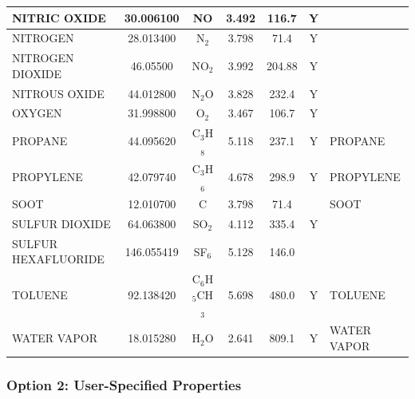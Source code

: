 \documentclass[11pt]{book}
\begin{document}
\begin{table}[p]
\begin{center}
\begin{tabular}{|l|c|c|c|c|c|l|}
{\ct NITRIC OXIDE}       & 30.006100  & NO               & 3.492    & 116.7    &  Y       &                                 \\ \hline
{\ct NITROGEN}           & 28.013400  & N$_2$            & 3.798    & 71.4     &  Y       &                                 \\ \hline
{\ct NITROGEN DIOXIDE}   & 46.05500   & NO$_2$           & 3.992    & 204.88   &  Y       &                                 \\ \hline
{\ct NITROUS OXIDE}      & 44.012800  & N$_2$O           & 3.828    & 232.4    &  Y       &                                 \\ \hline
{\ct OXYGEN}             & 31.998800  & O$_2$            & 3.467    & 106.7    &  Y       &                                 \\ \hline
{\ct PROPANE}            & 44.095620  & C$_3$H$_8$       & 5.118    & 237.1    &  Y       &  {\ct PROPANE}                  \\ \hline
{\ct PROPYLENE}          & 42.079740  & C$_3$H$_6$       & 4.678    & 298.9    &  Y       &  {\ct PROPYLENE}                \\ \hline
{\ct SOOT}               & 12.010700  & C                & 3.798    & 71.4     &          &  {\ct SOOT}                     \\ \hline
{\ct SULFUR DIOXIDE}     & 64.063800  & SO$_2$           & 4.112    & 335.4    &  Y       &                                 \\ \hline
{\ct SULFUR HEXAFLUORIDE}& 146.055419 & SF$_6$           & 5.128    & 146.0    &          &                                 \\ \hline
{\ct TOLUENE}            & 92.138420  & C$_6$H$_5$CH$_3$ & 5.698    & 480.0    &  Y       &  {\ct TOLUENE}                  \\ \hline
{\ct WATER VAPOR}        & 18.015280  & H$_2$O           & 2.641    & 809.1    &  Y       &  {\ct WATER VAPOR}              \\ \hline
\end{tabular}
\end{center}
\end{table}


\subsubsection{Option 2: User-Specified Properties}
\end{document}

